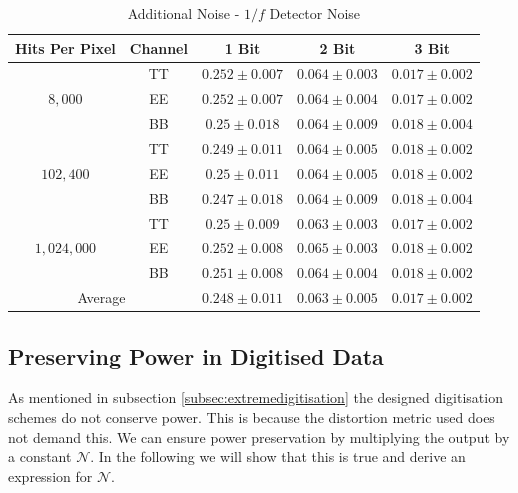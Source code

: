 \documentclass[apj]{emulateapj}
\begin{document}
\def\arraystretch{1.3}
\begin{table}[tbh]
\begin{center}
\caption{\label{tab:extranoiseoof} Additional Noise - $1/f$ Detector Noise}
\small
\begin{tabular}{c c c c c}
Hits Per Pixel & Channel & 1 Bit & 2 Bit & 3 Bit \\
\hline
\hline
\multirow{3}{*}{$8,000$}  & TT  & $ 0.252 \pm 0.007 $  & $ 0.064 \pm 0.003 $  & $ 0.017 \pm 0.002 $ \\
& EE  & $ 0.252 \pm 0.007 $  & $ 0.064 \pm 0.004 $  & $ 0.017 \pm 0.002 $ \\
& BB  & $ 0.25 \pm 0.018 $  & $ 0.064 \pm 0.009 $  & $ 0.018 \pm 0.004 $ \\
\hline
\multirow{3}{*}{$102,400$}  & TT  & $ 0.249 \pm 0.011 $  & $ 0.064 \pm 0.005 $  & $ 0.018 \pm 0.002 $ \\
& EE  & $ 0.25 \pm 0.011 $  & $ 0.064 \pm 0.005 $  & $ 0.018 \pm 0.002 $ \\
& BB  & $ 0.247 \pm 0.018 $  & $ 0.064 \pm 0.009 $  & $ 0.018 \pm 0.004 $ \\
\hline
\multirow{3}{*}{$1,024,000$}  & TT  & $ 0.25 \pm 0.009 $  & $ 0.063 \pm 0.003 $  & $ 0.017 \pm 0.002 $ \\
& EE  & $ 0.252 \pm 0.008 $  & $ 0.065 \pm 0.003 $  & $ 0.018 \pm 0.002 $ \\
& BB  & $ 0.251 \pm 0.008 $  & $ 0.064 \pm 0.004 $  & $ 0.018 \pm 0.002 $ \\
\hline
\multicolumn{2}{c}{Average}  & $ 0.248 \pm 0.011 $  & $ 0.063 \pm 0.005 $  & $ 0.017 \pm 0.002 $ \\
\end{tabular}
 \normalsize
\end{center}
\end{table}


\subsection{Preserving Power in Digitised Data}
\label{subsec:appendixpreservepower}

As mentioned in subsection \ref{subsec:extremedigitisation} the designed digitisation schemes do not conserve power. This is because the distortion metric used does not demand this. We can ensure power preservation by multiplying the output by a constant $\mathcal{N}$. In the following we will show that this is true and derive an expression for $\mathcal{N}$.
\end{document}
